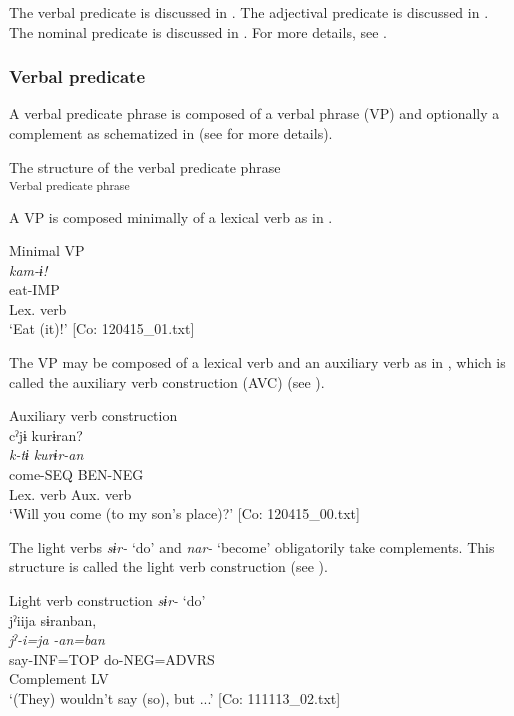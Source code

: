 The verbal predicate is discussed in . The adjectival predicate is discussed in . The nominal predicate is discussed in . For more details, see .

\subsubsection{Verbal predicate}\label{sec:4.1.3.1}

A verbal predicate phrase is composed of a verbal phrase (VP) and optionally a complement as schematized in  (see  for more details).

\ea\label{ex:4.5}  The structure of the verbal predicate phrase\\\textsubscript{Verbal predicate phrase}
\z

A VP is composed minimally of a lexical verb as in .

\ea\label{ex:4.6}  Minimal VP\\
    \glll \textit{kam-ɨ!}\\
    eat-IMP\\
    {Lex. verb}\\
    \glt     ‘Eat (it)!’   [Co: 120415\_01.txt]
\z

The VP may be composed of a lexical verb and an auxiliary verb as in , which is called the auxiliary verb construction (AVC) (see ).

\ea\label{ex:4.7}Auxiliary verb construction\\
    \gllll cˀjɨ  kurɨran?\\
    \textit{k-tɨ}  \textit{kurɨr-an}\\
    come-SEQ  BEN-NEG\\
    {Lex. verb}  {Aux. verb}\\
    \glt     ‘Will you come (to my son’s place)?’    [Co: 120415\_00.txt]
\z

The light verbs \textit{sɨr-} ‘do’ and \textit{nar-} ‘become’ obligatorily take complements. This structure is called the light verb construction (see ).

\ea  Light verb construction \label{ex:4.8}
 \ea  \textit{sɨr-} ‘do’\\
    \glll jˀiija  sɨranban,\\
    \textit{jˀ-i=ja}  \textit{-an=ban}\\
    say-INF=TOP  do-NEG=ADVRS\\
    Complement  LV\\
    \glt ‘(They) wouldn’t say (so), but ...’    [Co: 111113\_02.txt]

